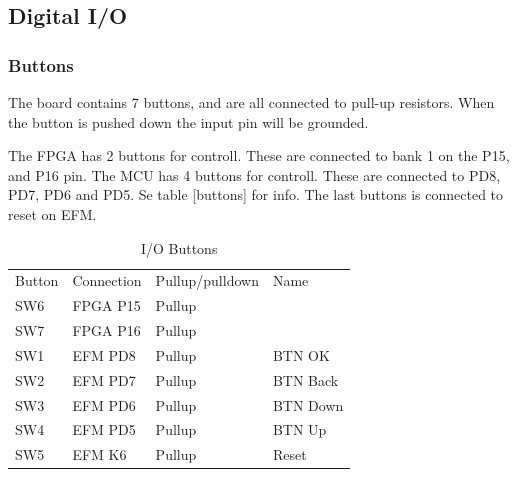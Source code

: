 \subsection{Digital I/O}
\subsubsection{Buttons}
The board contains 7 buttons, and are all connected to pull-up resistors. When the button is pushed down the input pin will be grounded. 

The FPGA has 2 buttons for controll. These are connected to bank 1 on the P15, and P16 pin.
The MCU has 4 buttons for controll. These are connected to PD8, PD7, PD6 and PD5. Se table [buttons] for info.
The last buttons is connected to reset on EFM. 

\begin{table}[]
\centering
\caption{I/O Buttons}
\label{buttons}
\begin{tabular}{llll}
Button & Connection & Pullup/pulldown & Name     \\
SW6    & FPGA P15   & Pullup          &          \\
SW7    & FPGA P16   & Pullup          &          \\
SW1    & EFM PD8    & Pullup          & BTN OK   \\
SW2    & EFM PD7    & Pullup          & BTN Back \\
SW3    & EFM PD6    & Pullup          & BTN Down \\
SW4    & EFM PD5    & Pullup          & BTN Up   \\
SW5    & EFM K6     & Pullup          & Reset   
\end{tabular}
\end{table}

